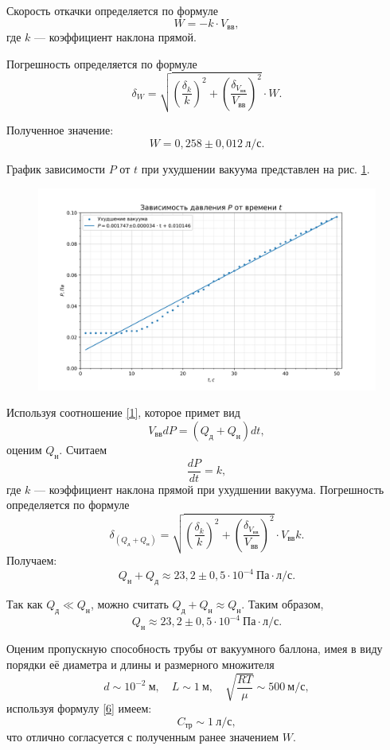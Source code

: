 \documentclass[a4paper, 12pt]{article}
\begin{document}
Скорость откачки определяется по формуле
\[W = -k \cdot V_{вв},\]
где $k$ --- коэффициент наклона прямой.

Погрешность определяется по формуле
\[\delta_{W} = \sqrt{\left(\frac{\delta_{k}}{k}\right)^2 + \left(\frac{\delta_{V_{вв}}}{V_{вв}}\right)^2} \cdot W.\]

Полученное значение:
\[ \boxed{W = 0,258\pm0,012~л/с}.\]

График зависимости $P$ от $t$ при ухудшении вакуума представлен на рис. \ref{ris4}.

\begin{figure}[h!]
\begin{flushleft}
    \includegraphics[scale=0.75]{2.3.1_2.png}
\end{flushleft}
\caption{}
\label{ris4}
\end{figure}

Используя соотношение \eqref{1}, которое примет вид $$V_{вв}dP = (Q_{д} + Q_{н})dt,$$ оценим $Q_{н}$. Считаем
\[\frac{dP}{dt} = k,\]
где $k$ --- коэффициент наклона прямой при ухудшении вакуума. Погрешность определяется по формуле
\[\delta_{(Q_{д} + Q_{н})} = \sqrt{\left(\frac{\delta_{k}}{k}\right)^2 + \left(\frac{\delta_{V_{вв}}}{V_{вв}}\right)^2} \cdot V_{вв}k.\]
Получаем:
\[Q_{н} + Q_{д} \approx 23,2\pm0,5 \cdot 10^{-4}~Па \cdot л/с.\]

Так как $Q_{д} \ll Q_{н}$, можно считать $Q_{д} + Q_{н} \approx Q_{н}$. Таким образом,
\[\boxed{Q_{н} \approx 23,2\pm0,5 \cdot 10^{-4}~Па \cdot л/с}.\]

Оценим пропускную способность трубы от вакуумного баллона, имея в виду порядки её диаметра и длины и размерного множителя $$d \sim 10^{-2}~м,\quad L \sim 1 ~м,\quad \sqrt{\frac{RT}{\mu}} \sim 500 ~м/с,$$ используя формулу \eqref{6} имеем:
$$C_\text{тр} \sim 1 ~л/с,$$
что отлично согласуется с полученным ранее значением $W$.
\end{document}
